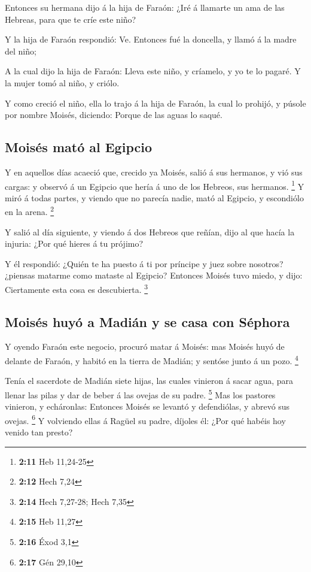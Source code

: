  Entonces su hermana dijo á la hija de Faraón: ¿Iré á
llamarte un ama de las Hebreas, para que te críe este niño?

 Y la hija de Faraón respondió: Ve. Entonces fué la
doncella, y llamó á la madre del niño;

 A la cual dijo la hija de Faraón: Lleva este niño, y
críamelo, y yo te lo pagaré. Y la mujer tomó al niño, y criólo.

 Y como creció el niño, ella lo trajo á la hija de Faraón,
la cual lo prohijó, y púsole por nombre Moisés, diciendo: Porque de las
aguas lo saqué.

\hypertarget{moisuxe9s-matuxf3-al-egipcio}{%
\subsection{Moisés mató al Egipcio}\label{moisuxe9s-matuxf3-al-egipcio}}

 Y en aquellos días acaeció que, crecido ya Moisés, salió á
sus hermanos, y vió sus cargas: y observó á un Egipcio que hería á uno
de los Hebreos, sus hermanos. \footnote{\textbf{2:11} Heb 11,24-25}
 Y miró á todas partes, y viendo que no parecía nadie, mató
al Egipcio, y escondiólo en la arena. \footnote{\textbf{2:12} Hech 7,24}

 Y salió al día siguiente, y viendo á dos Hebreos que
reñían, dijo al que hacía la injuria: ¿Por qué hieres á tu prójimo?

 Y él respondió: ¿Quién te ha puesto á ti por príncipe y
juez sobre nosotros? ¿piensas matarme como mataste al Egipcio? Entonces
Moisés tuvo miedo, y dijo: Ciertamente esta cosa es descubierta.
\footnote{\textbf{2:14} Hech 7,27-28; Hech 7,35}

\hypertarget{moisuxe9s-huyuxf3-a-madiuxe1n-y-se-casa-con-suxe9phora}{%
\subsection{Moisés huyó a Madián y se casa con
Séphora}\label{moisuxe9s-huyuxf3-a-madiuxe1n-y-se-casa-con-suxe9phora}}

 Y oyendo Faraón este negocio, procuró matar á Moisés: mas
Moisés huyó de delante de Faraón, y habitó en la tierra de Madián; y
sentóse junto á un pozo. \footnote{\textbf{2:15} Heb 11,27}

 Tenía el sacerdote de Madián siete hijas, las cuales
vinieron á sacar agua, para llenar las pilas y dar de beber á las ovejas
de su padre. \footnote{\textbf{2:16} Éxod 3,1}  Mas los
pastores vinieron, y echáronlas: Entonces Moisés se levantó y
defendiólas, y abrevó sus ovejas. \footnote{\textbf{2:17} Gén 29,10}
 Y volviendo ellas á Ragüel su padre, díjoles él: ¿Por qué
habéis hoy venido tan presto?

